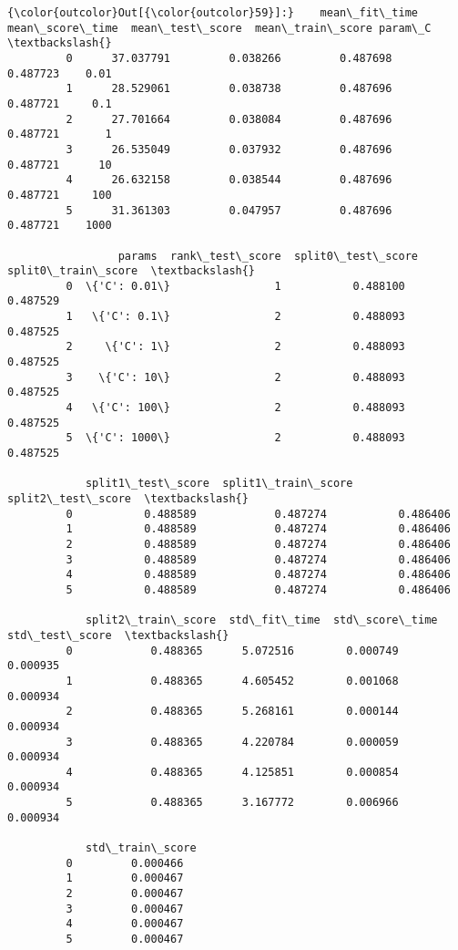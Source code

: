 \documentclass[11pt]{article}
\begin{document}
            \begin{Verbatim}[commandchars=\\\{\}]
{\color{outcolor}Out[{\color{outcolor}59}]:}    mean\_fit\_time  mean\_score\_time  mean\_test\_score  mean\_train\_score param\_C  \textbackslash{}
         0      37.037791         0.038266         0.487698          0.487723    0.01   
         1      28.529061         0.038738         0.487696          0.487721     0.1   
         2      27.701664         0.038084         0.487696          0.487721       1   
         3      26.535049         0.037932         0.487696          0.487721      10   
         4      26.632158         0.038544         0.487696          0.487721     100   
         5      31.361303         0.047957         0.487696          0.487721    1000   
         
                 params  rank\_test\_score  split0\_test\_score  split0\_train\_score  \textbackslash{}
         0  \{'C': 0.01\}                1           0.488100            0.487529   
         1   \{'C': 0.1\}                2           0.488093            0.487525   
         2     \{'C': 1\}                2           0.488093            0.487525   
         3    \{'C': 10\}                2           0.488093            0.487525   
         4   \{'C': 100\}                2           0.488093            0.487525   
         5  \{'C': 1000\}                2           0.488093            0.487525   
         
            split1\_test\_score  split1\_train\_score  split2\_test\_score  \textbackslash{}
         0           0.488589            0.487274           0.486406   
         1           0.488589            0.487274           0.486406   
         2           0.488589            0.487274           0.486406   
         3           0.488589            0.487274           0.486406   
         4           0.488589            0.487274           0.486406   
         5           0.488589            0.487274           0.486406   
         
            split2\_train\_score  std\_fit\_time  std\_score\_time  std\_test\_score  \textbackslash{}
         0            0.488365      5.072516        0.000749        0.000935   
         1            0.488365      4.605452        0.001068        0.000934   
         2            0.488365      5.268161        0.000144        0.000934   
         3            0.488365      4.220784        0.000059        0.000934   
         4            0.488365      4.125851        0.000854        0.000934   
         5            0.488365      3.167772        0.006966        0.000934   
         
            std\_train\_score  
         0         0.000466  
         1         0.000467  
         2         0.000467  
         3         0.000467  
         4         0.000467  
         5         0.000467  
\end{Verbatim}
        
\end{document}
